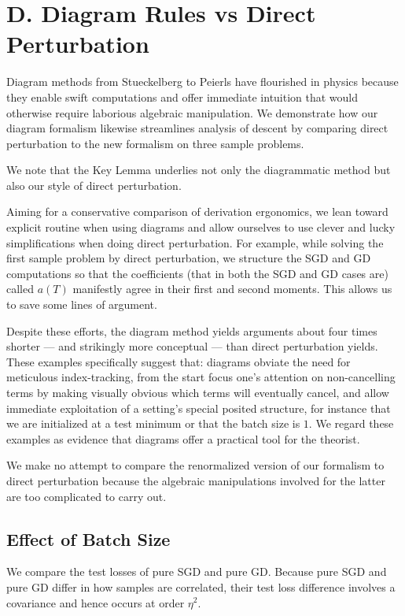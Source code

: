 \documentclass{article}
\begin{document}
\section*{D. Diagram Rules vs Direct Perturbation} \label{sect:compare}
    Diagram methods from Stueckelberg to Peierls have flourished in physics
    because they enable swift computations and offer immediate intuition that
    would otherwise require laborious algebraic manipulation.  We demonstrate
    how our diagram formalism likewise streamlines analysis of descent by
    comparing direct perturbation to the new formalism on three sample
    problems.

    We note that the Key Lemma underlies not only the diagrammatic method but
    also our style of direct perturbation.

    Aiming for a conservative comparison of derivation ergonomics, we lean
    toward explicit routine when using diagrams and allow ourselves to use
    clever and lucky simplifications when doing direct perturbation.  For
    example, while solving the first sample problem by direct perturbation,
    we structure the SGD and GD computations so that the coefficients (that in
    both the SGD and GD cases are) called $a(T)$ manifestly agree in their
    first and second moments.  This allows us to save some lines of argument.

    Despite these efforts, the diagram method yields arguments about four times
    shorter --- and strikingly more conceptual --- than direct perturbation
    yields.  These examples specifically suggest that: diagrams obviate the
    need for meticulous index-tracking, from the start focus one's attention on
    non-cancelling terms by making visually obvious which terms will eventually
    cancel, and allow immediate exploitation of a setting's special posited
    structure, for instance that we are initialized at a test minimum or that
    the batch size is $1$.  We regard these examples as evidence that diagrams
    offer a practical tool for the theorist.

    We make no attempt to compare the renormalized version of our formalism
    to direct perturbation because the algebraic manipulations involved for
    the latter are too complicated to carry out.  

    \subsection*{Effect of Batch Size}
        We compare the test losses of pure SGD and pure GD.  Because pure
        SGD and pure GD differ in how samples are correlated, their test loss
        difference involves a covariance and hence occurs at order $\eta^2$.  
\end{document}
